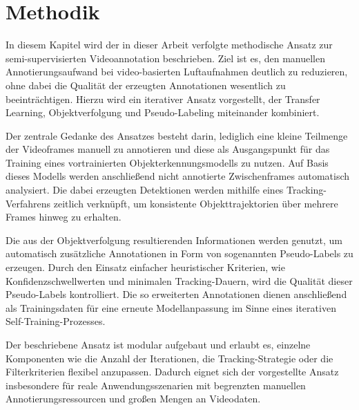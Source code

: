 \section{Methodik}

In diesem Kapitel wird der in dieser Arbeit verfolgte methodische Ansatz zur 
semi-supervisierten Videoannotation beschrieben. Ziel ist es, den manuellen 
Annotierungsaufwand bei video-basierten Luftaufnahmen deutlich zu reduzieren, 
ohne dabei die Qualität der erzeugten Annotationen wesentlich zu beeinträchtigen. 
Hierzu wird ein iterativer Ansatz vorgestellt, der Transfer Learning, 
Objektverfolgung und Pseudo-Labeling miteinander kombiniert.

Der zentrale Gedanke des Ansatzes besteht darin, lediglich eine kleine Teilmenge 
der Videoframes manuell zu annotieren und diese als Ausgangspunkt für das Training 
eines vortrainierten Objekterkennungsmodells zu nutzen. Auf Basis dieses Modells 
werden anschließend nicht annotierte Zwischenframes automatisch analysiert. Die 
dabei erzeugten Detektionen werden mithilfe eines Tracking-Verfahrens zeitlich 
verknüpft, um konsistente Objekttrajektorien über mehrere Frames hinweg zu 
erhalten.

Die aus der Objektverfolgung resultierenden Informationen werden genutzt, um 
automatisch zusätzliche Annotationen in Form von sogenannten Pseudo-Labels zu 
erzeugen. Durch den Einsatz einfacher heuristischer Kriterien, wie 
Konfidenzschwellwerten und minimalen Tracking-Dauern, wird die Qualität dieser 
Pseudo-Labels kontrolliert. Die so erweiterten Annotationen dienen anschließend 
als Trainingsdaten für eine erneute Modellanpassung im Sinne eines iterativen 
Self-Training-Prozesses.

Der beschriebene Ansatz ist modular aufgebaut und erlaubt es, einzelne 
Komponenten wie die Anzahl der Iterationen, die Tracking-Strategie oder die 
Filterkriterien flexibel anzupassen. Dadurch eignet sich der vorgestellte 
Ansatz insbesondere für reale Anwendungsszenarien mit begrenzten manuellen 
Annotierungsressourcen und großen Mengen an Videodaten.


\newpage

\usetikzlibrary{shapes.geometric, arrows.meta, positioning, calc}

